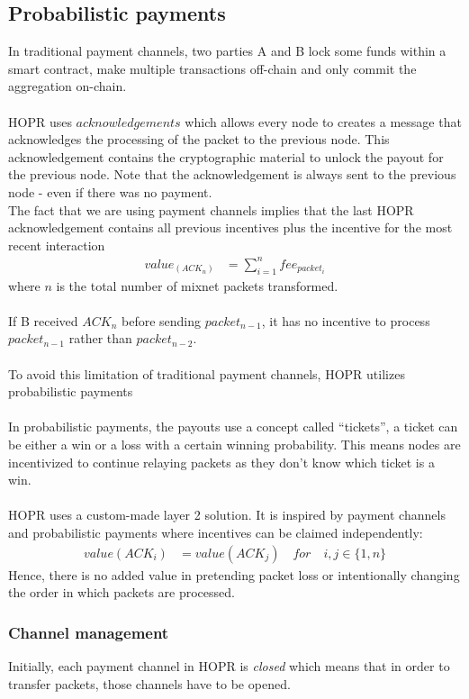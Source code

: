 \subsection{Probabilistic payments}
In traditional payment channels, two parties A and B lock some funds within a smart contract, make multiple transactions off-chain and only commit the aggregation on-chain.
\\~\\HOPR uses $acknowledgements$ which allows every node to creates a message that acknowledges the processing of the packet to the previous node. This acknowledgement contains the cryptographic material to unlock the payout for the previous node. Note that the acknowledgement is always sent to the previous node - even if there was no payment.
\\The fact that we are using payment channels implies that the last HOPR acknowledgement contains all previous incentives plus the incentive for the most recent interaction
\begin{align}  
value_(ACK_n) &=\sum_{i=1}^nfee_{packet_i}
     \end{align}
where $n$ is the total number of mixnet packets transformed.
\\~\\If B received $ACK_n$ before sending $packet_{n-1}$, it has no incentive to process $packet_{n-1}$ rather than $packet_{n-2}$.
\\~\\To avoid this limitation of traditional payment channels, HOPR utilizes probabilistic payments
\\~\\In probabilistic payments, the payouts use a concept called “tickets”, a ticket can be either a win or a loss with a certain winning probability. This means nodes are incentivized to continue relaying packets as they don’t know which ticket is a win.
\\~\\HOPR uses a custom-made layer 2 solution. It is inspired by payment channels and probabilistic payments where incentives can be claimed independently:
\begin{align}  
 value ( ACK_i )  &  =value ( ACK_j ) \quad for \quad i,j\in \{1,n\}
         \end{align}
Hence, there is no added value in pretending packet loss or intentionally changing the order in which packets are processed.
\subsubsection{Channel management}
Initially, each payment channel in HOPR is \textit{closed} which means that in order to transfer packets, those channels have to be opened.
